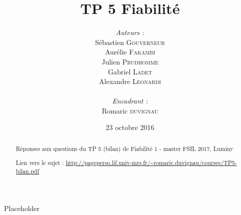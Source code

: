 \documentclass[a4paper,11pt]{article}
\title{
  \textbf{TP 5 Fiabilité}\\
}
\author{
\begin{minipage}{0.4\textwidth}
	\begin{flushleft} \large
		\emph{Auteurs :}\\
        Sébastien \textsc{Gouverneur}\\
        Aurélie \textsc{Fakambi}\\
        Julien \textsc{Prudhomme}\\
        Gabriel \textsc{Ladet}\\
		Alexandre \textsc{Leonardi}\\
	\end{flushleft}
\end{minipage}
\begin{minipage}{0.4\textwidth}
	\begin{flushright} \large
		\emph{Encadrant :} \\
		Romaric \textsc{duvignau}\\
	\end{flushright}
\end{minipage}
}
\date{23 octobre 2016}
\begin{document}
\maketitle
\thispagestyle{empty}
\begin{abstract}
Réponses aux questions du TP 5 (bilan) de Fiabilité 1 - master FSIL 2017, Luminy

Lien vers le sujet : \url{http://pageperso.lif.univ-mrs.fr/~romaric.duvignau/courses/TP5-bilan.pdf}
\end{abstract}
\pagebreak

\tableofcontents
\pagebreak


Placeholder
\end{document}
